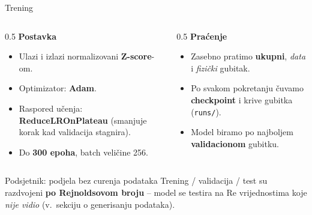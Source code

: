 \documentclass[10pt,aspectratio=169]{beamer}
\begin{document}
\begin{frame}{Trening}
  \begin{columns}[T]
    \begin{column}{0.5\textwidth}
      \textbf{Postavka}
      \begin{itemize}
        \item Ulazi i izlazi normalizovani \textbf{Z-score}-om.
        \item Optimizator: \textbf{Adam}.
        \item Raspored učenja: \textbf{ReduceLROnPlateau}
              (smanjuje korak kad validacija stagnira).
        \item Do \textbf{300 epoha}, batch veličine 256.
      \end{itemize}
    \end{column}
    \begin{column}{0.5\textwidth}
      \textbf{Praćenje}
      \begin{itemize}
        \item Zasebno pratimo \textbf{ukupni}, \emph{data} i \emph{fizički} gubitak.
        \item Po svakom pokretanju čuvamo \textbf{checkpoint} i krive gubitka
              (\texttt{runs/}).
        \item Model biramo po najboljem \textbf{validacionom} gubitku.
      \end{itemize}
    \end{column}
  \end{columns}
  \vfill
  \begin{block}{Podsjetnik: podjela bez curenja podataka}
    Trening / validacija / test su razdvojeni \textbf{po Rejnoldsovom broju} --
    model se testira na $\mathrm{Re}$ vrijednostima koje \emph{nije vidio}
    (v.\ sekciju o generisanju podataka).
  \end{block}
\end{frame}
\end{document}
